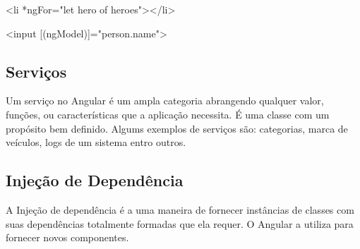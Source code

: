 <li *ngFor="let hero of heroes"></li>

<input [(ngModel)]="person.name">


\subsection{Serviços}
Um serviço no Angular é um ampla categoria abrangendo qualquer valor, funções, ou características que a aplicação necessita. É uma classe com um propósito bem definido. Algums exemplos de serviços são: categorias, marca de veículos, logs de um sistema entro outros.

\subsection{Injeção de Dependência}
A Injeção de dependência é a uma maneira de fornecer instâncias de classes com suas dependências totalmente formadas que ela requer. O Angular a utiliza para fornecer novos componentes. 